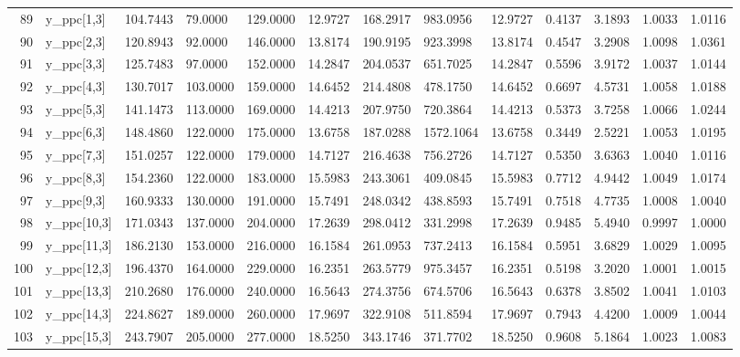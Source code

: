 \begin{table}[ht]
\begin{tabular}{rllllllllllll}
  89 & y\_ppc[1,3] & 104.7443 &   79.0000 & 129.0000 &  12.9727 &   168.2917 &  983.0956 &  12.9727 &  0.4137 &  3.1893 & 1.0033 &  1.0116 \\ 
  90 & y\_ppc[2,3] & 120.8943 &   92.0000 & 146.0000 &  13.8174 &   190.9195 &  923.3998 &  13.8174 &  0.4547 &  3.2908 & 1.0098 &  1.0361 \\ 
  91 & y\_ppc[3,3] & 125.7483 &   97.0000 & 152.0000 &  14.2847 &   204.0537 &  651.7025 &  14.2847 &  0.5596 &  3.9172 & 1.0037 &  1.0144 \\ 
  92 & y\_ppc[4,3] & 130.7017 &  103.0000 & 159.0000 &  14.6452 &   214.4808 &  478.1750 &  14.6452 &  0.6697 &  4.5731 & 1.0058 &  1.0188 \\ 
  93 & y\_ppc[5,3] & 141.1473 &  113.0000 & 169.0000 &  14.4213 &   207.9750 &  720.3864 &  14.4213 &  0.5373 &  3.7258 & 1.0066 &  1.0244 \\ 
  94 & y\_ppc[6,3] & 148.4860 &  122.0000 & 175.0000 &  13.6758 &   187.0288 & 1572.1064 &  13.6758 &  0.3449 &  2.5221 & 1.0053 &  1.0195 \\ 
  95 & y\_ppc[7,3] & 151.0257 &  122.0000 & 179.0000 &  14.7127 &   216.4638 &  756.2726 &  14.7127 &  0.5350 &  3.6363 & 1.0040 &  1.0116 \\ 
  96 & y\_ppc[8,3] & 154.2360 &  122.0000 & 183.0000 &  15.5983 &   243.3061 &  409.0845 &  15.5983 &  0.7712 &  4.9442 & 1.0049 &  1.0174 \\ 
  97 & y\_ppc[9,3] & 160.9333 &  130.0000 & 191.0000 &  15.7491 &   248.0342 &  438.8593 &  15.7491 &  0.7518 &  4.7735 & 1.0008 &  1.0040 \\ 
  98 & y\_ppc[10,3] & 171.0343 &  137.0000 & 204.0000 &  17.2639 &   298.0412 &  331.2998 &  17.2639 &  0.9485 &  5.4940 & 0.9997 &  1.0000 \\ 
  99 & y\_ppc[11,3] & 186.2130 &  153.0000 & 216.0000 &  16.1584 &   261.0953 &  737.2413 &  16.1584 &  0.5951 &  3.6829 & 1.0029 &  1.0095 \\ 
  100 & y\_ppc[12,3] & 196.4370 &  164.0000 & 229.0000 &  16.2351 &   263.5779 &  975.3457 &  16.2351 &  0.5198 &  3.2020 & 1.0001 &  1.0015 \\ 
  101 & y\_ppc[13,3] & 210.2680 &  176.0000 & 240.0000 &  16.5643 &   274.3756 &  674.5706 &  16.5643 &  0.6378 &  3.8502 & 1.0041 &  1.0103 \\ 
  102 & y\_ppc[14,3] & 224.8627 &  189.0000 & 260.0000 &  17.9697 &   322.9108 &  511.8594 &  17.9697 &  0.7943 &  4.4200 & 1.0009 &  1.0044 \\ 
  103 & y\_ppc[15,3] & 243.7907 &  205.0000 & 277.0000 &  18.5250 &   343.1746 &  371.7702 &  18.5250 &  0.9608 &  5.1864 & 1.0023 &  1.0083 \\ 

\end{tabular}
\end{table}
